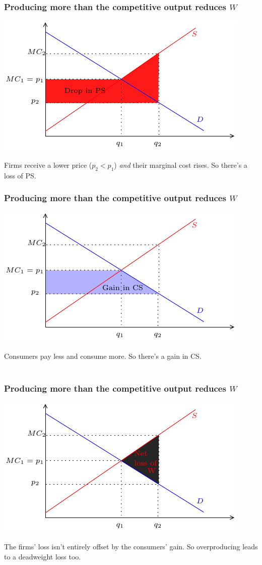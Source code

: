 \documentclass[xcolor=pdftex,dvipsnames]{beamer}
\begin{document}
\begin{frame}
\frametitle{Producing more than the competitive output reduces $W$}
\begin{center}
\includegraphics{pics/CEEff6}
\end{center}
Firms receive a lower price ($p_2<p_1$) \emph{and} their marginal cost
rises. So there's a loss of PS.
\end{frame}

\begin{frame}
\frametitle{Producing more than the competitive output reduces $W$}
\begin{center}
\includegraphics{pics/CEEff7}
\end{center}
Consumers pay less and consume more. So there's a gain in CS.\\
\
\end{frame}
\begin{frame}
\frametitle{Producing more than the competitive output reduces $W$}
\begin{center}
\includegraphics{pics/CEEff8}
\end{center}
The firms' loss isn't entirely offset by the consumers' gain. So
overproducing leads to a deadweight loss too.
\end{frame}
\end{document}
